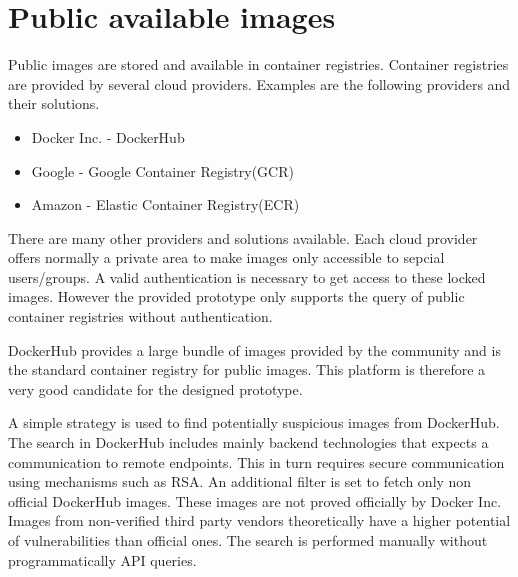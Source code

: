 \section{Public available images}
\label{ch:eval:public_images}
Public images are stored and available in container registries. 
Container registries are provided by several cloud providers.
Examples are the following providers and their solutions.
\begin{itemize}
    \item Docker Inc. - DockerHub
    \item Google - Google Container Registry(GCR)
    \item Amazon - Elastic Container Registry(ECR)
\end{itemize}{}    
There are many other providers and solutions available. 
Each cloud provider offers normally a private area to make images only accessible to sepcial users/groups. 
A valid authentication is necessary to get access to these locked images.
However the provided prototype only supports the query of public container registries without authentication.

DockerHub provides a large bundle of images provided by the community and is the standard container registry for public images.
This platform is therefore a very good candidate for the designed prototype.

A simple strategy is used to find potentially suspicious images from DockerHub.
The search in DockerHub includes mainly backend technologies that expects a communication to remote endpoints.
This in turn requires secure communication using mechanisms such as RSA.
An additional filter is set to fetch only non official DockerHub images.
These images are not proved officially by Docker Inc.
Images from non-verified third party vendors theoretically have a higher potential of vulnerabilities than official ones.
The search is performed manually without programmatically API queries. 


